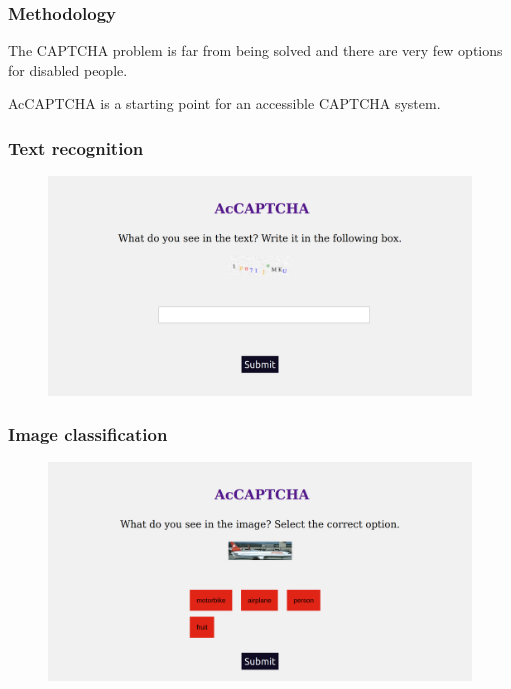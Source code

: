\documentclass{beamer}
\begin{document}
\begin{frame}
	\frametitle{Methodology}
	The CAPTCHA problem is far from being solved and there are very few options for disabled people.

	AcCAPTCHA is a starting point for an accessible CAPTCHA system.

\end{frame}

\begin{frame}
	\frametitle{Text recognition}
	\begin{figure}[h!t]
		\centering
		\includegraphics[scale=0.15]{assets/images/text_recognition.png}
	\end{figure}

\end{frame}
\begin{frame}
	\frametitle{Image classification}
	\begin{figure}[h!t]
		\centering
		\includegraphics[scale=0.15]{assets/images/image_classification.png}
	\end{figure}

\end{frame}
\end{document}
